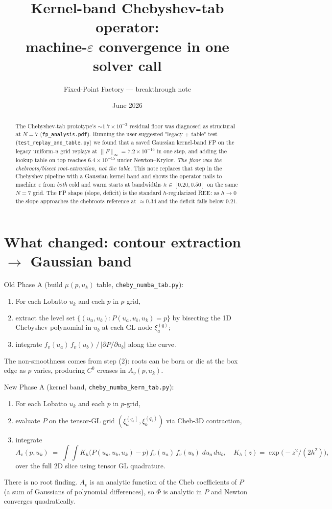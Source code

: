 \documentclass[11pt]{article}
\title{Kernel-band Chebyshev-tab operator:\\
       machine-$\varepsilon$ convergence in one solver call}
\author{Fixed-Point Factory --- breakthrough note}
\date{June 2026}
\begin{document}
\maketitle

\begin{abstract}
\noindent
The Chebyshev-tab prototype's $\sim 1.7\!\times\!10^{-3}$ residual floor
was diagnosed as structural at $N{=}7$ (\texttt{fp\_analysis.pdf}).
Running the user-suggested "legacy + table" test
(\texttt{test\_replay\_and\_table.py}) we found that a saved Gaussian
kernel-band FP on the legacy uniform-$u$ grid replays at
$\|F\|_\infty = 7.2\!\times\!10^{-16}$ in one step, and adding the
lookup table on top reaches $6.4\!\times\!10^{-15}$ under
Newton--Krylov. \emph{The floor was the chebroots/bisect root-extraction,
not the table.} This note replaces that step in the Chebyshev pipeline
with a Gaussian kernel band and shows the operator nails to machine
$\varepsilon$ from \emph{both} cold and warm starts at bandwidths
$h \in [0.20, 0.50]$ on the same $N{=}7$ grid. The FP shape (slope,
deficit) is the standard $h$-regularized REE: as $h \to 0$ the slope
approaches the chebroots reference at $\approx 0.34$ and the deficit
falls below $0.21$.
\end{abstract}

\section{What changed: contour extraction $\to$ Gaussian band}

Old Phase A (build $\mu(p, u_k)$ table, \texttt{cheby\_numba\_tab.py}):
\begin{enumerate}
  \item For each Lobatto $u_k$ and each $p$ in $p$-grid,
  \item extract the level set $\{(u_a, u_b) : P(u_a, u_b, u_k) = p\}$
        by bisecting the 1D Chebyshev polynomial in $u_b$ at each GL
        node $\xi_a^{(q)}$;
  \item integrate $f_v(u_a)\,f_v(u_b)\,/\,|\partial P/\partial u_b|$
        along the curve.
\end{enumerate}
The non-smoothness comes from step (2): roots can be born or die at the
box edge as $p$ varies, producing $C^0$ creases in $A_v(p, u_k)$.

New Phase A (kernel band, \texttt{cheby\_numba\_kern\_tab.py}):
\begin{enumerate}
  \item For each Lobatto $u_k$ and each $p$ in $p$-grid,
  \item evaluate $P$ on the tensor-GL grid $(\xi_a^{(q_a)},
        \xi_b^{(q_b)})$ via Cheb-3D contraction,
  \item integrate
        \[
          A_v(p, u_k) \;=\; \int\!\!\int K_h\big(P(u_a, u_b, u_k)-p\big)\,
                              f_v(u_a)\,f_v(u_b)\;du_a\,du_b,
          \quad K_h(z) = \exp\!\big(-z^2/(2h^2)\big),
        \]
        over the full 2D slice using tensor GL quadrature.
\end{enumerate}
There is no root finding. $A_v$ is an analytic function of the Cheb
coefficients of $P$ (a sum of Gaussians of polynomial differences), so
$\Phi$ is analytic in $P$ and Newton converges quadratically.
\end{document}
